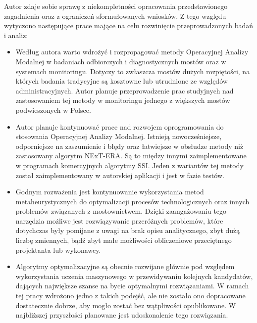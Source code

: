 Autor zdaje sobie sprawę z niekompletności opracowania przedstawionego zagadnienia oraz z ograniczeń sformułowanych wniosków. Z tego względu wytyczono następujące prace mające na celu rozwinięcie przeprowadzonych badań i analiz:
\begin{itemize}
	\item Według autora warto wdrożyć i rozpropagować metody Operacyjnej Analizy Modalnej w badaniach odbiorczych i diagnostycznych mostów oraz w systemach monitoringu. Dotyczy to zwłaszcza mostów dużych rozpiętości, na których badania tradycyjne są kosztowne lub utrudnione ze względów administracyjnych. Autor planuje przeprowadzenie prac studyjnych nad zastosowaniem tej metody w monitoringu jednego z większych mostów podwieszonych w Polsce.
	\item Autor planuje kontynuować prace nad rozwojem oprogramowania do stosowania Operacyjnej Analizy Modalnej. Istnieją nowocześniejsze, odporniejsze na zaszumienie i błędy oraz łatwiejsze w obsłudze metody niż zastosowany algorytm NExT-ERA. Są to między innymi zaimplementowane w programach komercyjnych algorytmy SSI. Jeden z wariantów tej metody został zaimplementowany w autorskiej aplikacji i jest w fazie testów.
	\item Godnym rozważenia jest kontynuowanie wykorzystania metod metaheurystycznych do optymalizacji procesów technologicznych oraz innych problemów związanych z mostownictwem. Dzięki zaangażowaniu tego narzędzia możliwe jest rozwiązywanie przeróżnych problemów, które dotychczas były pomijane z uwagi na brak opisu analitycznego, zbyt dużą liczbę zmiennych, bądź zbyt małe możliwości obliczeniowe przeciętnego projektanta lub wykonawcy.
	\item  Algorytmy optymalizacyjne są obecnie rozwijane głównie pod względem wykorzystania uczenia maszynowego w przewidywaniu kolejnych kandydatów, dających największe szanse na bycie optymalnymi rozwiązaniami. W ramach tej pracy wdrożono jedno z takich podejść, ale nie zostało ono dopracowane dostatecznie dobrze, aby mogło zostać bez wątpliwości opublikowane. W najbliższej przyszłości planowane jest udoskonalenie tego rozwiązania.
\end{itemize}  




